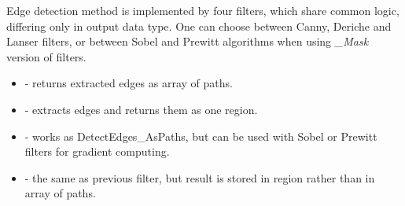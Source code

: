 \begin{refImpl}
Edge detection method is implemented by four \studio filters, which share common logic, differing only in output data type. One can choose between Canny, Deriche and Lanser filters, or between Sobel and Prewitt algorithms when using \textit{\_Mask} version of filters.
\begin{itemize}
	 \item {} - returns extracted edges as array of paths.
	 \item {} - extracts edges and returns them as one region.
	 \item {} - works as DetectEdges\_AsPaths, but can be used with Sobel or Prewitt filters for gradient computing.
	 \item {} - the same as previous filter, but result is stored in region rather than in array of paths.
\end{itemize}
\end{refImpl}